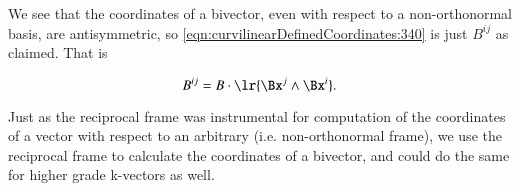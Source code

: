 We see that the coordinates of a bivector, even with respect to a non-orthonormal basis, are antisymmetric, so
\cref{eqn:curvilinearDefinedCoordinates:340} is just \( B^{ij} \) as claimed.  That is

\begin{dmath}\label{eqn:curvilinearDefinedCoordinates:401}
B^{ij} = B \cdot \lr{ \Bx^{j} \wedge \Bx^{i} }.
\end{dmath}

Just as the reciprocal frame was instrumental for computation of the coordinates of a vector with respect to an arbitrary (i.e. non-orthonormal frame), we use the reciprocal frame to calculate the coordinates of a bivector, and could do the same for higher grade k-vectors as well.
